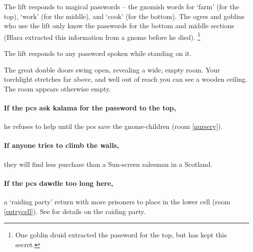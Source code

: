 \begin{multicols}{2}
The lift responds to magical passwords -- the gnomish words for `farm' (for the top), `work' (for the middle), and `cook' (for the bottom).
The ogres and goblins who use the lift only know the passwords for the bottom and middle sections (Blara extracted this information from a gnome before he died).%
\footnote{One goblin druid extracted the password for the top, but has kept this secret.}

The lift responds to any password spoken while standing on it.

\begin{boxtext}
  The great double doors swing open, revealing a wide, empty room.
  Your torchlight stretches far above, and well out of reach you can see a wooden ceiling.
  The room appears otherwise empty.
\end{boxtext}

\paragraph{If the \glspl{pc} ask \gls{kalama} for the password to the top,}
he refuses to help until the \glspl{pc} save the gnome-children (room \vref{nursery}).

\paragraph{If anyone tries to climb the walls,}
they will find less purchase than a Sun-screen salesman in a Scotland.

\paragraph{If the \glspl{pc} dawdle too long here,}
a `raiding party' return with more prisoners to place in the lower cell (room \ref{entrycell}).
See  for details on the raiding party.



\end{multicols}
